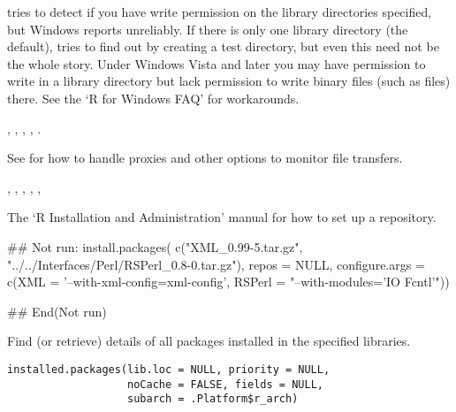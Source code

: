 %
\begin{Note}\relax
{} tries to detect if you have write permission
on the library directories specified, but Windows reports unreliably.
If there is only one library directory (the default), \R{} tries to
find out by creating a test directory, but even this need not be the
whole story.  Under Windows Vista and later you may have permission to
write in a library directory but lack permission to write binary files
(such as  files) there.  See the `R for Windows FAQ'
for workarounds.
\end{Note}
%
\begin{SeeAlso}\relax
{},
,
,
,
.

See  for how to handle proxies and
other options to monitor file transfers.

, , ,
, , 

The `R Installation and Administration' manual for how to 
set up a repository.
\end{SeeAlso}
%
\begin{Examples}
\begin{ExampleCode}

## Not run: 
install.packages(
    c("XML_0.99-5.tar.gz",
      "../../Interfaces/Perl/RSPerl_0.8-0.tar.gz"),
    repos = NULL,
    configure.args = c(XML = '--with-xml-config=xml-config',
                       RSPerl = "--with-modules='IO Fcntl'"))

## End(Not run)
\end{ExampleCode}
\end{Examples}
%
\begin{Description}\relax
Find (or retrieve) details of all packages installed in the specified
libraries.
\end{Description}
%
\begin{Usage}
\begin{verbatim}
installed.packages(lib.loc = NULL, priority = NULL,
                   noCache = FALSE, fields = NULL,
                   subarch = .Platform$r_arch)
\end{verbatim}
\end{Usage}
